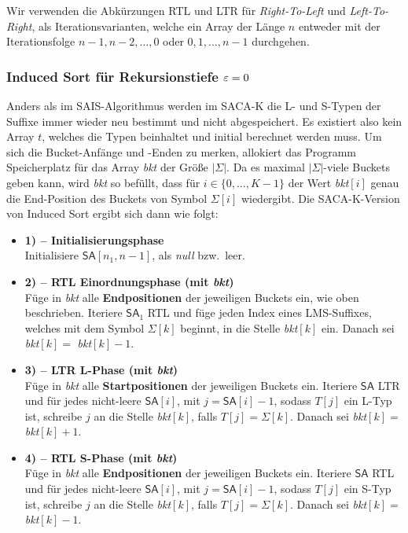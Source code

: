 Wir verwenden die Abkürzungen RTL und LTR für \textit{Right-To-Left} und \textit{Left-To-Right}, als Iterationsvarianten, welche ein Array der Länge $n$ entweder mit der Iterationsfolge $n-1, n-2, \ldots, 0$ oder $0, 1, \ldots, n - 1$ durchgehen. 

\subsubsection{ Induced Sort für Rekursionstiefe $\varepsilon = 0$}

Anders als im SAIS-Algorithmus werden im SACA-K die L- und S-Typen der Suffixe immer wieder neu bestimmt und nicht abgespeichert. Es existiert also kein Array $t$, welches die Typen beinhaltet und initial berechnet werden muss. Um sich die Bucket-Anfänge und -Enden zu merken, allokiert das Programm Speicherplatz für das Array \textit{bkt} der Größe $|\Sigma|$. Da es maximal $|\Sigma|$-viele Buckets geben kann, wird \textit{bkt} so befüllt, dass für $i \in \{0, \ldots, K-1\}$ der Wert \textit{bkt}$[i]$ genau die End-Position des Buckets von Symbol $\Sigma[i]$ wiedergibt. Die SACA-K-Version von Induced Sort ergibt sich dann wie folgt:
\begin{itemize}
\item \textbf{1) -- Initialisierungsphase} \\
Initialisiere $\mathsf{SA}[n_1, n-1]$, als \textit{null} bzw.\ leer.

\item \textbf{2) -- RTL Einordnungsphase (mit \textit{bkt})} \\
Füge in \textit{bkt}  alle \textbf{Endpositionen} der jeweiligen Buckets ein, wie oben beschrieben. Iteriere $\mathsf{SA}_1$ RTL und füge jeden Index eines LMS-Suffixes, welches mit dem Symbol $\Sigma[k]$ beginnt, in die Stelle \textit{bkt}$[k]$ ein. Danach sei \textit{bkt}$[k] = $ \textit{bkt}$[k]-1$.

\item \textbf{3) -- LTR L-Phase (mit \textit{bkt})} \\
Füge in \textit{bkt}  alle \textbf{Startpositionen} der jeweiligen Buckets ein. Iteriere $\mathsf{SA}$ LTR und für jedes nicht-leere $\mathsf{SA}[i]$, mit $j = \mathsf{SA}[i]-1$, sodass $T[j]$ ein L-Typ ist, schreibe $j$ an die Stelle \textit{bkt}$[k]$, falls $T[j] = \Sigma[k]$. Danach sei \textit{bkt}$[k] = $ \textit{bkt}$[k]+1$.

\item \textbf{4) -- RTL S-Phase (mit \textit{bkt})} \\
Füge in \textit{bkt}  alle \textbf{Endpositionen} der jeweiligen Buckets ein. Iteriere $\mathsf{SA}$ RTL und für jedes nicht-leere $\mathsf{SA}[i]$, mit $j = \mathsf{SA}[i]-1$, sodass $T[j]$ ein S-Typ ist, schreibe $j$ an die Stelle \textit{bkt}$[k]$, falls $T[j] = \Sigma[k]$. Danach sei \textit{bkt}$[k] = $ \textit{bkt}$[k]-1$.
\end{itemize}

